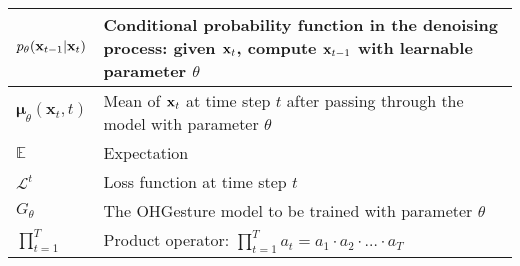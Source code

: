 \begin{center}
\begin{tabular}{|p{3cm}|p{12cm}|}
\hline
$p_{\theta} (\mathbf{x}_{t-1} | \mathbf{x}_{t})$ & Conditional probability function in the denoising process: given $\mathbf{x}_t$, compute $\mathbf{x}_{t-1}$ with learnable parameter $\theta$ \\
\hline
$\boldsymbol{\mu}_\theta(\mathbf{x}_t, t)$ & Mean of $\mathbf{x}_t$ at time step $t$ after passing through the model with parameter $\theta$ \\
\hline
$\mathbb{E}$ & Expectation \\
\hline
$\mathcal{L}^t$ & Loss function at time step $t$ \\
\hline
$G_\theta$ & The OHGesture model to be trained with parameter $\theta$ \\
\hline
$\prod^T_{t=1}$ & Product operator: $\prod_{t=1}^T a_t = a_1 \cdot a_2 \cdot \ldots \cdot a_T$ \\
\hline
\end{tabular}
\end{center}

\pagebreak
